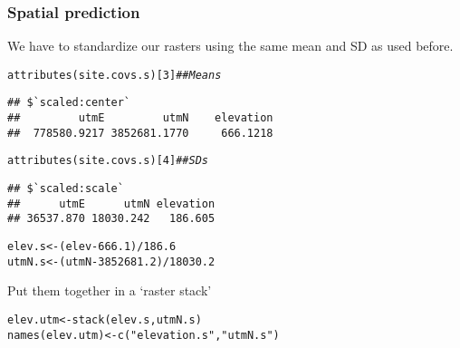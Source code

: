 \documentclass[color=usenames,dvipsnames]{beamer}\usepackage[]{graphicx}\usepackage[]{color}
\makeatletter
\newcommand{\hlnum}[1]{\textcolor[rgb]{0.69,0.494,0}{#1}}%
\newcommand{\hlstr}[1]{\textcolor[rgb]{0.749,0.012,0.012}{#1}}%
\newcommand{\hlcom}[1]{\textcolor[rgb]{0.514,0.506,0.514}{\textit{#1}}}%
\newcommand{\hlopt}[1]{\textcolor[rgb]{0,0,0}{#1}}%
\newcommand{\hlstd}[1]{\textcolor[rgb]{0,0,0}{#1}}%
\newcommand{\hlkwb}[1]{\textcolor[rgb]{0,0.341,0.682}{#1}}%
\newcommand{\hlkwd}[1]{\textcolor[rgb]{0.004,0.004,0.506}{#1}}%
\newenvironment{kframe}{%
 \def\at@end@of@kframe{}%
 \ifinner\ifhmode%
  \def\at@end@of@kframe{\end{minipage}}%
  \begin{minipage}{\columnwidth}%
 \fi\fi%
 \def\FrameCommand##1{\hskip\@totalleftmargin \hskip-\fboxsep
 \colorbox{shadecolor}{##1}\hskip-\fboxsep
     \hskip-\linewidth \hskip-\@totalleftmargin \hskip\columnwidth}%
 \MakeFramed {\advance\hsize-\width
   \@totalleftmargin\z@ \linewidth\hsize
   \@setminipage}}%
 {\par\unskip\endMakeFramed%
 \at@end@of@kframe}
\newenvironment{knitrout}{}{} %
\makeatother
\begin{document}
\begin{frame}[fragile]
  \frametitle{Spatial prediction}
  We have to standardize our rasters \alert{using the same mean and SD
    as used before}.  
\vspace{-6pt}
\begin{knitrout}\scriptsize
{}\color{fgcolor}\begin{kframe}
\begin{alltt}
\hlkwd{attributes}\hlstd{(site.covs.s)[}\hlnum{3}\hlstd{]} \hlcom{## Means}
\end{alltt}
\begin{verbatim}
## $`scaled:center`
##         utmE         utmN    elevation 
##  778580.9217 3852681.1770     666.1218
\end{verbatim}
\begin{alltt}
\hlkwd{attributes}\hlstd{(site.covs.s)[}\hlnum{4}\hlstd{]} \hlcom{## SDs}
\end{alltt}
\begin{verbatim}
## $`scaled:scale`
##      utmE      utmN elevation 
## 36537.870 18030.242   186.605
\end{verbatim}
\end{kframe}
\end{knitrout}
\pause
\vfill
\begin{knitrout}\scriptsize
{}\color{fgcolor}\begin{kframe}
\begin{alltt}
\hlstd{elev.s} \hlkwb{<-} \hlstd{(elev}\hlopt{-}\hlnum{666.1}\hlstd{)}\hlopt{/}\hlnum{186.6}
\hlstd{utmN.s} \hlkwb{<-} \hlstd{(utmN}\hlopt{-}\hlnum{3852681.2}\hlstd{)}\hlopt{/}\hlnum{18030.2}
\end{alltt}
\end{kframe}
\end{knitrout}
\pause
\vfill
Put them together in a `raster stack'
\vspace{-6pt}
\begin{knitrout}\scriptsize
{}\color{fgcolor}\begin{kframe}
\begin{alltt}
\hlstd{elev.utm} \hlkwb{<-} \hlkwd{stack}\hlstd{(elev.s,utmN.s)}
\hlkwd{names}\hlstd{(elev.utm)} \hlkwb{<-} \hlkwd{c}\hlstd{(}\hlstr{"elevation.s"}\hlstd{,} \hlstr{"utmN.s"}\hlstd{)}
\end{alltt}
\end{kframe}
\end{knitrout}
\end{frame}
\end{document}
